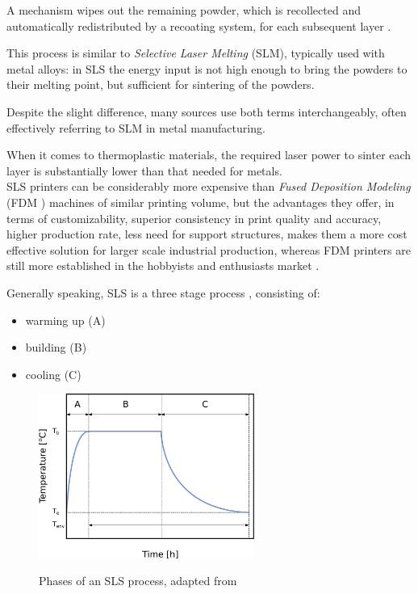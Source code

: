 \documentclass{article}
\begin{document}
    A mechanism wipes out the remaining powder, which is recollected and automatically redistributed by a recoating 
    system, for each subsequent layer \autocite*{Padovano_SLS_Review}. 

    This process is similar to \textit{Selective Laser Melting} (SLM), typically used with metal alloys: in SLS the energy input is not high enough 
    to bring the powders to their melting point, but sufficient for sintering of the powders. 

    Despite the slight difference, many sources use both terms interchangeably, often effectively referring to SLM in metal manufacturing. 
    
    When it comes to thermoplastic materials, the required laser power to sinter each layer is substantially lower than that needed for metals. \\ 

    SLS printers can be considerably more expensive than \textit{Fused Deposition Modeling} (FDM \footnotemark) machines of similar printing volume, but the advantages they offer, 
    in terms of customizability, superior consistency in print quality and accuracy, higher production rate, less need for support structures, 
    makes them a more cost effective solution for larger scale industrial production, whereas FDM printers are still more established 
    in the hobbyists and enthusiasts market \autocite*{Padovano_SLS_Review}. \\ 


    Generally speaking, SLS is a three stage process \autocites{Padovano_SLS_Review}, consisting of: 
    
    \begin{itemize}
        \item warming up (A)
        \item building (B)
        \item cooling (C)
    \end{itemize}

    \begin{figure}[ht]
        \centering
        \includegraphics[width=0.63\textwidth]{Pictures/SLS_temp_over_time.eps}\\
        \caption{Phases of an SLS process, adapted from \autocites{Padovano_SLS_Review}} 
        \label{fig:SLS_temp_over_time}
    \end{figure}
\end{document}
